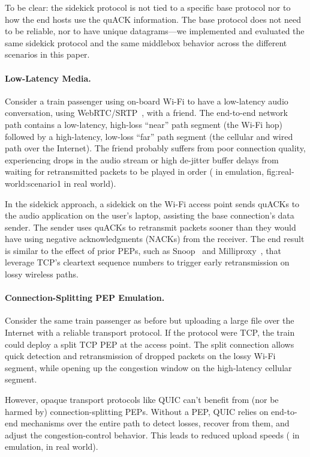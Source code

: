 To be clear: the sidekick protocol is not tied to a specific base protocol
nor to how the end hosts use the quACK information. The base protocol does not
need to be reliable, nor to have unique datagrams---we implemented and evaluated
the same sidekick protocol and the same middlebox behavior across the different
scenarios in this paper.

\paragraph{Low-Latency Media.}

Consider a train passenger using on-board Wi-Fi to have a low-latency audio
conversation, using WebRTC/SRTP~\cite{rfc8834webrtc}, with a friend. The
end-to-end network path contains a low-latency, high-loss ``near'' path
segment (the Wi-Fi hop) followed by a high-latency, low-loss ``far'' path
segment (the cellular and wired path over the Internet). The friend probably
suffers from poor connection quality, experiencing drops in the audio stream or
high de-jitter buffer delays from waiting for retransmitted packets to be
played in order ( in emulation, \Cref
{fig:real-world:scenario1} in real world).

In the sidekick approach, a sidekick on the Wi-Fi access point sends quACKs to the audio
application on the user's laptop, assisting the base connection's data sender.
The sender uses quACKs to retransmit packets sooner than they would have using
negative acknowledgments (NACKs) from the receiver. The end result is similar
to the effect of prior PEPs, such as Snoop~\cite{balakrishnan1995snoop} and
Milliproxy~\cite{polese2017milliproxy}, that leverage TCP's cleartext sequence
numbers to trigger early retransmission on lossy wireless paths.

\paragraph{Connection-Splitting PEP Emulation.}

Consider the same train passenger as before but uploading a large file over the
Internet with a reliable transport protocol. If the protocol were TCP, the
train could deploy a split TCP PEP at the access point. The split connection
allows quick detection and retransmission of dropped packets on the lossy Wi-Fi
segment, while opening up the congestion window on the high-latency cellular
segment.

However, opaque transport protocols like QUIC can't benefit from (nor be harmed
by) connection-splitting PEPs. Without a PEP, QUIC relies on end-to-end
mechanisms over the entire path to detect losses, recover from them, and adjust
the congestion-control behavior. This leads to reduced upload speeds
( in emulation,  in real world).

